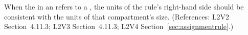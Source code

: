 When the  in an \AssignmentRule refers to a \Compartment,
the units of the rule's right-hand side should be consistent with the units
of that compartment's size.  (References: L2V2 Section~4.11.3;
L2V3 Section~4.11.3; L2V4 Section~\ref{sec:assignmentrule}.)
